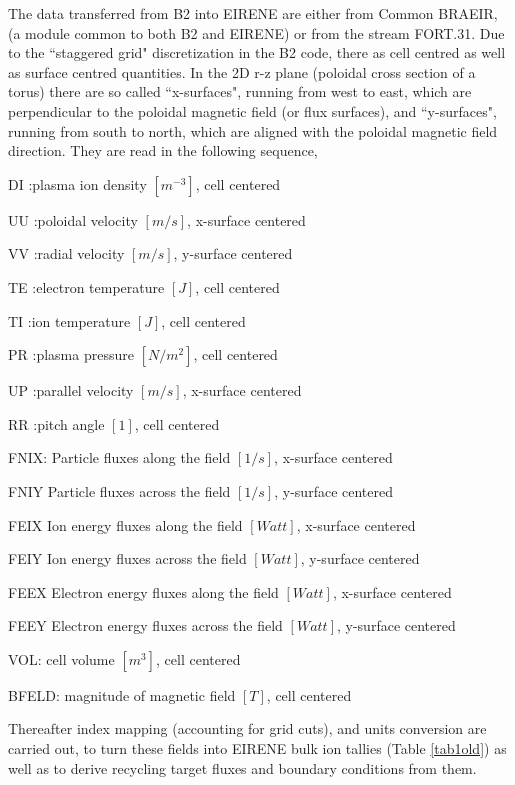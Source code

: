 \noindent
The data transferred from B2 into EIRENE are either from Common BRAEIR, (a module common to both B2 and EIRENE)
or from the stream FORT.31. Due to the ``staggered grid" discretization in the B2 code,
there as cell centred as well as surface centred quantities.
In the 2D r-z plane (poloidal cross section of a torus) there are so called ``x-surfaces", running from west to east, which are perpendicular to the
poloidal magnetic field (or flux surfaces), and ``y-surfaces", running from south to north,  which are aligned with the poloidal magnetic field direction.
They are read in the following sequence,
\begin{list}{ }{}
\item[{= 1 }] DI :plasma ion density $[m^{-3}]$, cell centered
\item[{= 2 }] UU :poloidal velocity $[m/s]$, x-surface centered
\item[{= 3 }] VV :radial velocity $[m/s]$, y-surface centered
\item[{= 4 }] TE :electron temperature $[J]$, cell centered
\item[{= 5 }] TI :ion temperature $[J]$, cell centered
\item[{= 6 }] PR :plasma pressure $[N/m^2]$, cell centered
\item[{= 7 }] UP :parallel velocity $[m/s]$, x-surface centered
\item[{= 8 }] RR :pitch angle $[1]$, cell centered
\item[{= 9 }] FNIX: Particle fluxes along the field $[1/s]$, x-surface centered
\item[{= 10 }] FNIY Particle fluxes across the field $[1/s]$, y-surface centered
\item[{= 11 }] FEIX Ion energy fluxes along the field $[Watt]$, x-surface centered
\item[{= 12 }] FEIY Ion energy fluxes across the field $[Watt]$, y-surface centered
\item[{= 13 }] FEEX Electron energy fluxes along the field $[Watt]$, x-surface centered
\item[{= 14 }] FEEY Electron energy fluxes across the field $[Watt]$, y-surface centered
\item[{= 15 }] VOL: cell volume $[m^3]$, cell centered
\item[{= 16 }] BFELD: magnitude of magnetic field $[T]$, cell centered
\end{list}

Thereafter index mapping (accounting for grid cuts), and units conversion are carried out,  to turn these fields into EIRENE bulk ion tallies (Table \ref{tab1old})
as well as to derive recycling target fluxes and boundary conditions from them.

